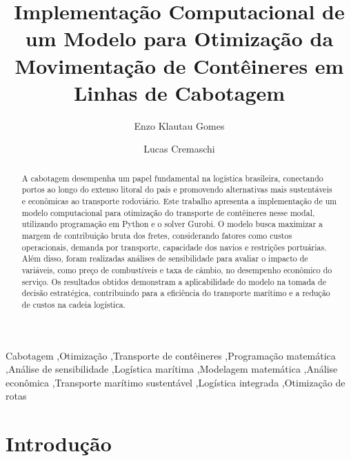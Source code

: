 \documentclass[preprint,10pt,5p]{elsarticle}
\begin{document}
\begin{frontmatter}

\title{Implementação Computacional de um Modelo para Otimização da Movimentação de Contêineres em Linhas de Cabotagem}

\address[label1]{Escola Politécnica da Universidade de São Paulo, São Paulo, Brazil}

\author[label1]{Enzo Klautau Gomes}

\author[label1]{Lucas Cremaschi}

\begin{abstract}
A cabotagem desempenha um papel fundamental na logística brasileira, conectando portos ao longo do extenso litoral do país e promovendo alternativas mais sustentáveis e econômicas ao transporte rodoviário. Este trabalho apresenta a implementação de um modelo computacional para otimização do transporte de contêineres nesse modal, utilizando programação em Python e o solver Gurobi. O modelo busca maximizar a margem de contribuição bruta dos fretes, considerando fatores como custos operacionais, demanda por transporte, capacidade dos navios e restrições portuárias. Além disso, foram realizadas análises de sensibilidade para avaliar o impacto de variáveis, como preço de combustíveis e taxa de câmbio, no desempenho econômico do serviço. Os resultados obtidos demonstram a aplicabilidade do modelo na tomada de decisão estratégica, contribuindo para a eficiência do transporte marítimo e a redução de custos na cadeia logística.
\end{abstract}


\begin{keyword}
Cabotagem \sep Otimização \sep Transporte de contêineres \sep Programação matemática \sep Análise de sensibilidade \sep Logística marítima \sep Modelagem matemática \sep Análise econômica \sep Transporte marítimo sustentável \sep Logística integrada \sep Otimização de rotas
\end{keyword}



\end{frontmatter}

\section{Introdução}
\label{sec:intro}
\end{document}
